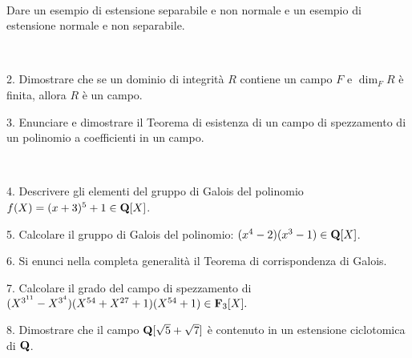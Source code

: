 \ \dotfill\ \bigskip\bigskip\bigskip\vfil

 Dare un esempio di estensione separabile e non normale e un esempio di estensione 
normale e non separabile.\medskip\bigskip\bigskip

\ \dotfill\ \bigskip\bigskip\bigskip


\vfil\eject


\item{2.} Dimostrare che se un dominio di integrit\`a $R$ contiene un campo $F$ e $\dim_FR$ \`e finita, allora $R$ \`e un campo.

\vv


\item{3.} Enunciare e dimostrare il Teorema di esistenza di un campo di spezzamento di un polinomio a coefficienti in un campo.

\ve\ \vs


\item{4.} Descrivere gli elementi del gruppo di Galois del polinomio $f(X)=(x+3)^5+1 \in{\bf Q}[X]$. \vv

\item{5.} Calcolare il gruppo di Galois del polinomio: $(x^4-2)(x^3-1)\in{\bf Q}[X]$.
\ve\ \vs


\item{6.} Si enunci nella completa generalit\`a il Teorema di
corrispondenza di Galois.\vv\vv


\item{7.} Calcolare il grado del campo di spezzamento di 
$(X^{3^{11}}-X^{3^{4}})(X^{54}+X^{27}+1)(X^{54}+1)\in{\bf F}_3[X].$\vv\vv

\item{8.} Dimostrare che il campo ${\bf Q}[\sqrt{5}+\sqrt{7}]$ \`e contenuto in un estensione
ciclotomica di ${\bf Q}$.


\vv



\ \vst
 \bye
